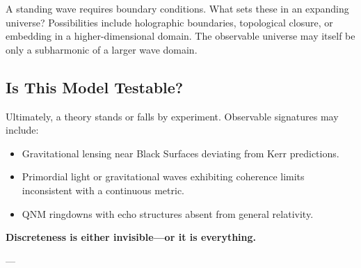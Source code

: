 \documentclass[12pt]{article}
\begin{document}
A standing wave requires boundary conditions. What sets these in an expanding universe? Possibilities include holographic boundaries, topological closure, or embedding in a higher-dimensional domain. The observable universe may itself be only a subharmonic of a larger wave domain.

\subsection{Is This Model Testable?}

Ultimately, a theory stands or falls by experiment. Observable signatures may include:

\begin{itemize}
    \item Gravitational lensing near Black Surfaces deviating from Kerr predictions.
    \item Primordial light or gravitational waves exhibiting coherence limits inconsistent with a continuous metric.
    \item QNM ringdowns with echo structures absent from general relativity.
\end{itemize}

\vspace{2em}

\begin{center}
\textbf{Discreteness is either invisible---or it is everything.}
\end{center}


---


\newpage

\end{document}
